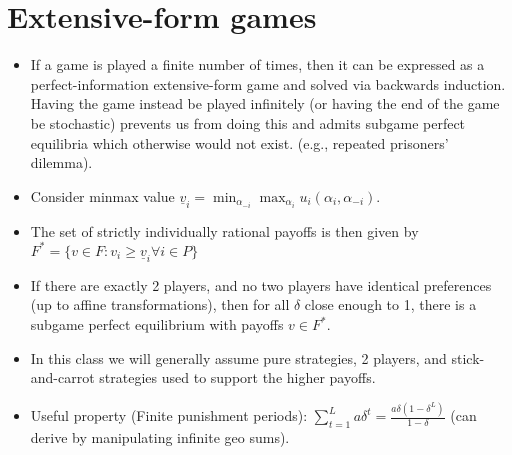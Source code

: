 \documentclass[11pt]{article} %
\begin{document}
\section{Extensive-form games}
\begin{itemize}
\item If a game is played a finite number of times, then it can be expressed as a perfect-information extensive-form game and solved via backwards induction. Having the game instead be played infinitely (or having the end of the game be stochastic) prevents us from doing this and admits subgame perfect equilibria which otherwise would not exist. (e.g., repeated prisoners' dilemma).
\item Consider minmax value $\underline{v}_i = \min_{\alpha_{-i}}\max_{\alpha_i}u_i(\alpha_i,\alpha_{-i}).$
\item The set of strictly individually rational payoffs is then given by $F^{*} = \{v \in F : v_i \geq \underline{v}_i  \forall i \in P  \}$
\item If there are exactly 2 players, and no two players have identical preferences (up to affine transformations), then for all $\delta$ close enough to 1, there is a subgame perfect equilibrium with payoffs $v \in F^{*}$.
\item In this class we will generally assume pure strategies, 2 players, and stick-and-carrot strategies used to support the higher payoffs.
\item Useful property (Finite punishment periods): $\sum_{t=1}^{L}a\delta^t = \frac{a\delta (1-\delta^L)}{1-\delta}$ (can derive by manipulating infinite geo sums).
\end{itemize}
\end{document}
